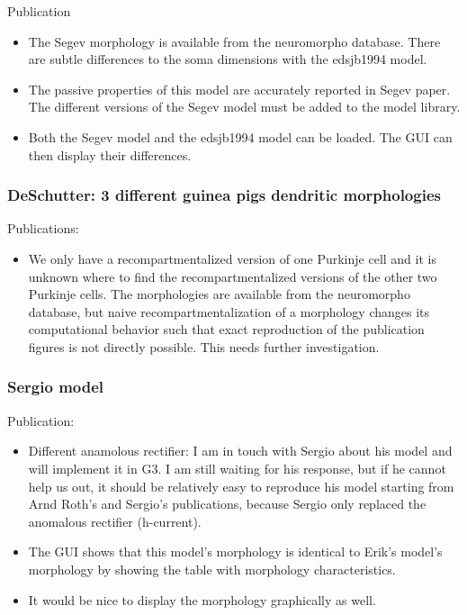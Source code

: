 \documentclass[12pt]{article}
\begin{document}
Publication~\cite{Rapp-P:1994qf}

\begin{itemize}
\item The Segev morphology is available from the
  neuromorpho database.  There are subtle differences to the soma
  dimensions with the edsjb1994 model.
\item The passive properties of this model are accurately reported in
  Segev paper.  The different versions of the Segev model must be
  added to the model library.
\item Both the Segev model and the edsjb1994 model can be loaded.  The
  GUI can then display their differences.
\end{itemize}


\subsubsection{DeSchutter: 3 different guinea pigs dendritic
  morphologies}

Publications:~\cite{deschutter94:_purkin_i}\cite{deschutter94:_purkin_ii}

\begin{itemize}
\item We only have a recompartmentalized version of one Purkinje cell
  and it is unknown where to find the recompartmentalized versions of
  the other two Purkinje cells.  The morphologies are available from
  the neuromorpho database, but naive recompartmentalization of a
  morphology changes its computational behavior such that exact
  reproduction of the publication figures is not directly possible.
  This needs further investigation.
\end{itemize}


\subsubsection{Sergio model}

Publication:~\cite{solinas06:_dendr_purkin}

\begin{itemize}
\item Different anamolous rectifier: I am in touch with Sergio about
  his model and will implement it in G3.  I am still waiting for his
  response, but if he cannot help us out, it should be relatively easy
  to reproduce his model starting from Arnd Roth's and Sergio's
  publications, because Sergio only replaced the anomalous rectifier
  (h-current).
\item The GUI shows that this model's morphology is identical to
  Erik's model's morphology by showing the table with morphology
  characteristics.
\item It would be nice to display the morphology graphically as well.
\end{itemize}
\end{document}
